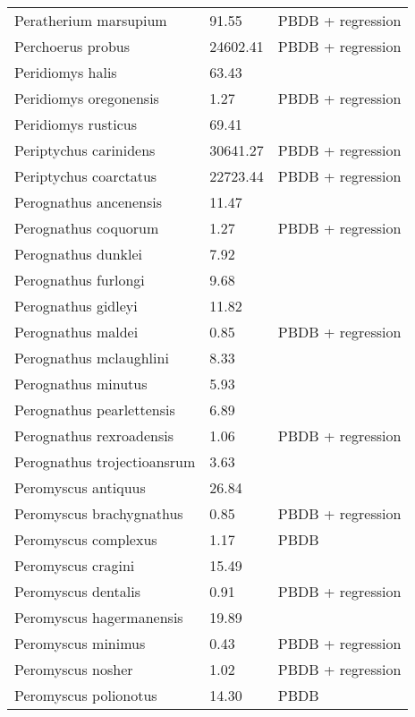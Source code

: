 \documentclass{article}
\begin{document}
\begin{center}
\begin{longtable}{p{} p{} p{}}
    Peratherium marsupium & 91.55 & PBDB + regression \\ 
    Perchoerus probus & 24602.41 & PBDB + regression \\ 
    Peridiomys halis & 63.43 & \cite{Tomiya2013} \\ 
    Peridiomys oregonensis & 1.27 & PBDB + regression \\ 
    Peridiomys rusticus & 69.41 & \cite{Tomiya2013} \\ 
    Periptychus carinidens & 30641.27 & PBDB + regression \\ 
    Periptychus coarctatus & 22723.44 & PBDB + regression \\ 
    Perognathus ancenensis & 11.47 & \cite{Tomiya2013} \\ 
    Perognathus coquorum & 1.27 & PBDB + regression \\ 
    Perognathus dunklei & 7.92 & \cite{Tomiya2013} \\ 
    Perognathus furlongi & 9.68 & \cite{Tomiya2013} \\ 
    Perognathus gidleyi & 11.82 & \cite{Tomiya2013} \\ 
    Perognathus maldei & 0.85 & PBDB + regression \\ 
    Perognathus mclaughlini & 8.33 & \cite{Tomiya2013} \\ 
    Perognathus minutus & 5.93 & \cite{Tomiya2013} \\ 
    Perognathus pearlettensis & 6.89 & \cite{Tomiya2013} \\ 
    Perognathus rexroadensis & 1.06 & PBDB + regression \\ 
    Perognathus trojectioansrum & 3.63 & \cite{Tomiya2013} \\ 
    Peromyscus antiquus & 26.84 & \cite{Tomiya2013} \\ 
    Peromyscus brachygnathus & 0.85 & PBDB + regression \\ 
    Peromyscus complexus & 1.17 & PBDB \\ 
    Peromyscus cragini & 15.49 & \cite{Tomiya2013} \\ 
    Peromyscus dentalis & 0.91 & PBDB + regression \\ 
    Peromyscus hagermanensis & 19.89 & \cite{Tomiya2013} \\ 
    Peromyscus minimus & 0.43 & PBDB + regression \\ 
    Peromyscus nosher & 1.02 & PBDB + regression \\ 
    Peromyscus polionotus & 14.30 & PBDB \\ 

\end{longtable}
\end{center}
\end{document}
